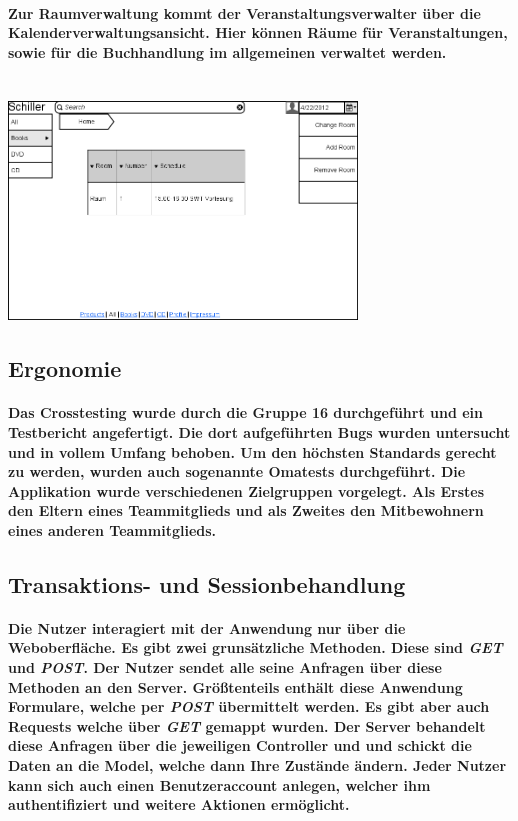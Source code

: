 \documentclass[a4paper]{article}
\begin{document}
\paragraph{Zur Raumverwaltung kommt der Veranstaltungsverwalter über die Kalenderverwaltungsansicht. Hier können Räume für Veranstaltungen, sowie für die Buchhandlung im allgemeinen verwaltet werden.\\ \\}
\includegraphics[width=350px]{19ChangeRoom.png}

\subsection{Ergonomie}

\paragraph{Das Crosstesting wurde durch die Gruppe 16 durchgeführt und ein Testbericht angefertigt. Die dort aufgeführten Bugs wurden untersucht und in vollem Umfang behoben. Um den höchsten Standards gerecht zu werden, wurden auch sogenannte Omatests durchgeführt. Die Applikation wurde verschiedenen Zielgruppen vorgelegt. Als Erstes den Eltern eines Teammitglieds und als Zweites den Mitbewohnern eines anderen Teammitglieds.}

\subsection{Transaktions- und Sessionbehandlung}

\paragraph{Die Nutzer interagiert mit der Anwendung nur über die Weboberfläche. Es gibt zwei grunsätzliche Methoden. Diese sind \textit{GET} und \textit{POST}. Der Nutzer sendet alle seine Anfragen über diese Methoden an den Server. Größtenteils enthält diese Anwendung Formulare, welche per \textit{POST} übermittelt werden. Es gibt aber auch Requests welche über \textit{GET} gemappt wurden. Der Server behandelt diese Anfragen über die jeweiligen Controller und und schickt die Daten an die Model, welche dann Ihre Zustände ändern. Jeder Nutzer kann sich auch einen Benutzeraccount anlegen, welcher ihm authentifiziert und weitere Aktionen ermöglicht.}
\end{document}
